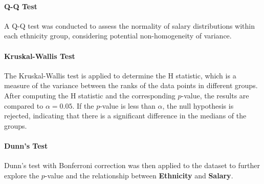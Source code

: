 \paragraph{Q-Q Test}
A Q-Q test was conducted to assess the normality of salary distributions within each ethnicity group, considering potential non-homogeneity of variance.

\paragraph{Kruskal-Wallis Test}
The Kruskal-Wallis test is applied to determine the H statistic, which is a measure of the variance between the ranks of the data points in different groups. After computing the H statistic and the corresponding $p$-value, the results are compared to $\alpha = 0.05$. If the $p$-value is less than $\alpha$, the null hypothesis is rejected, indicating that there is a significant difference in the medians of the groups.

\paragraph{Dunn's Test}
Dunn's test with Bonferroni correction was then applied to the dataset to further explore the $p$-value and the relationship between \textbf{Ethnicity} and \textbf{Salary}.

